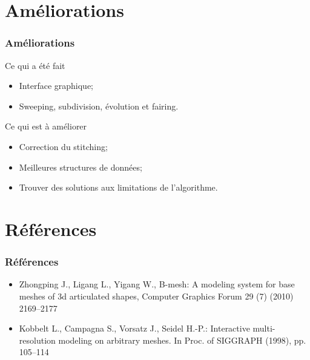 \documentclass[9pt]{beamer}
\begin{document}
\section{Améliorations}
\begin{frame}
	\frametitle{Améliorations}
	
	\begin{block}{Ce qui a été fait}
		\begin{itemize}
			\item Interface graphique;
			\item Sweeping, subdivision, évolution et fairing.
		\end{itemize}
	\end{block}
	
	\begin{block}{Ce qui est à améliorer}
		\begin{itemize}
			\item Correction du stitching;
			\item Meilleures structures de données;
			\item Trouver des solutions aux limitations de l'algorithme.
		\end{itemize}
	\end{block}
\end{frame}


\section{Références}
\begin{frame}
	\frametitle{Références}
	\begin{itemize}
		\item  Zhongping J., Ligang L., Yigang W., B-mesh: A modeling system for base meshes of 3d articulated shapes, Computer 					Graphics Forum 29 (7) (2010) 2169–2177
		\item Kobbelt L., Campagna S., Vorsatz J., Seidel H.-P.: Interactive multi-resolution modeling on arbitrary meshes. In Proc. of SIGGRAPH (1998), pp. 105–114
	\end{itemize}
\end{frame}






\end{document}
